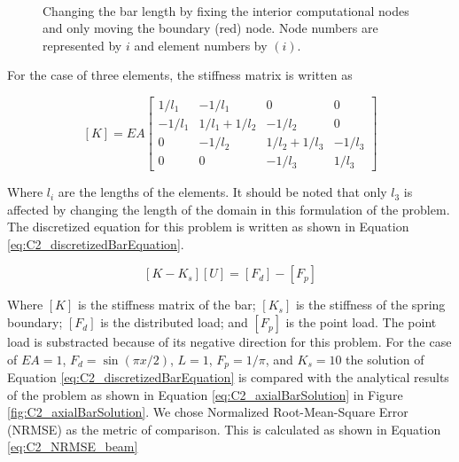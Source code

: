 \begin{figure}[H]
    \centering
    \\
    \caption{Changing the bar length by fixing the interior computational nodes and only moving the boundary (red) node. Node numbers are represented by $i$ and element numbers by $(i)$.}
    \label{fig:C2_axialBarComputationalDomain}
\end{figure}

For the case of three elements, the stiffness matrix is written as

\begin{equation}\label{eq:C2_stiffnessMatrixOfBar}
    [K] = 
    EA
    \begin{bmatrix}
    1/l_1 & -1/l_1 & 0 & 0 \\
    -1/l_1 & 1/l_1 + 1/l_2 & -1/l_2 & 0 \\
    0 & -1/l_2 & 1/l_2 + 1/l_3 & -1/l_3 \\
    0 & 0 & -1/l_3 & 1/l_3
    \end{bmatrix}
\end{equation}

Where $l_i$ are the lengths of the elements. It should be noted that only $l_3$ is affected by changing the length of the domain in this formulation of the problem. The discretized equation for this problem is written as shown in Equation \eqref{eq:C2_discretizedBarEquation}.

\begin{equation}\label{eq:C2_discretizedBarEquation}
    [K - K_s] [U] = [F_d] - [F_p]
\end{equation}

Where $[K]$ is the stiffness matrix of the bar; $[K_s]$ is the stiffness of the spring boundary; $[F_d]$ is the distributed load; and $[F_p]$ is the point load. The point load is substracted because of its negative direction for this problem. For the case of $EA = 1$, $F_d = \sin(\pi x / 2)$, $L = 1$, $F_p = 1 / \pi$, and $K_s = 10$ the solution of Equation \eqref{eq:C2_discretizedBarEquation} is compared with the analytical results of the problem as shown in Equation \eqref{eq:C2_axialBarSolution} in Figure \ref{fig:C2_axialBarSolution}. We chose Normalized Root-Mean-Square Error (NRMSE) as the metric of comparison. This is calculated as shown in Equation \eqref{eq:C2_NRMSE_beam}

